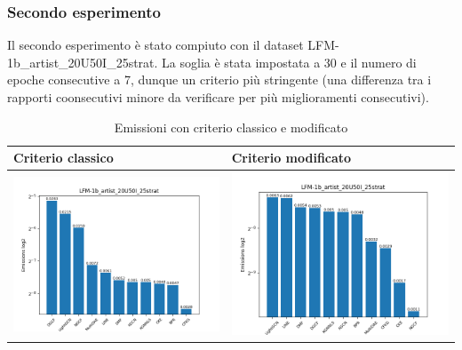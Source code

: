 \subsubsection{Secondo esperimento}
Il secondo esperimento è stato compiuto con il dataset LFM-1b\_artist\_20U50I\_25strat. La soglia è stata impostata a 30 e il numero di epoche consecutive a 7, dunque un criterio più stringente (una differenza tra i rapporti coonsecutivi minore da verificare per più miglioramenti consecutivi).


\begin{table}[H]
    \centering
    \footnotesize
    \setlength\tabcolsep{0pt}
    \begin{tabularx}{\textwidth}{|X|X|}
        \hline
        \textbf{Criterio classico} & \textbf{Criterio modificato} \\
        \hline
        \includegraphics[width=\linewidth, trim=0 0 0 0]{images/emissions_LFM-1b_artist_20U50I_25strat_earlyClassic.png} &
        \includegraphics[width=\linewidth, trim=0 0 0 0]{images/emissions_LFM-1b_artist_20U50I_25strat_earlyModified.png} \\
        \hline
    \end{tabularx}
    \caption{Emissioni con criterio classico e modificato}
    \label{tab:emissions_info}
\end{table}



